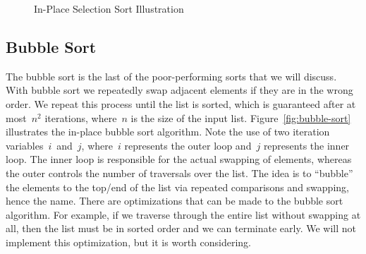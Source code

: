 \begin{figure}[tp]
\caption{In-Place Selection Sort Illustration}
\end{figure}

\subsection{Bubble Sort}
The bubble sort is the last of the poor-performing sorts that we will discuss. With bubble sort we repeatedly swap adjacent elements if they are in the wrong order. We repeat this process until the list is sorted, which is guaranteed after at most~$n^2$ iterations, where~$n$ is the size of the input list. Figure~\ref{fig:bubble-sort} illustrates the in-place bubble sort algorithm. Note the use of two iteration variables~$i$~and~$j$, where~$i$ represents the outer loop and~$j$ represents the inner loop. The inner loop is responsible for the actual swapping of elements, whereas the outer controls the number of traversals over the list. The idea is to ``bubble'' the elements to the top/end of the list via repeated comparisons and swapping, hence the name. There are optimizations that can be made to the bubble sort algorithm. For example, if we traverse through the entire list without swapping at all, then the list must be in sorted order and we can terminate early. We will not implement this optimization, but it is worth considering.

